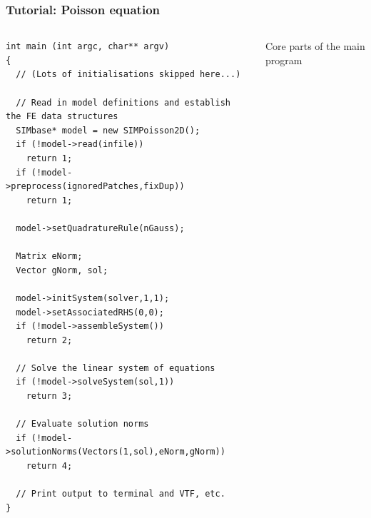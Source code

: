 \documentclass{beamer}
\begin{document}
\begin{frame}[fragile] %
 \frametitle{Tutorial: Poisson equation}

 \begin{columns}[c]
  \tiny\begin{verbatim}
int main (int argc, char** argv)
{
  // (Lots of initialisations skipped here...)

  // Read in model definitions and establish the FE data structures
  SIMbase* model = new SIMPoisson2D();
  if (!model->read(infile))
    return 1;
  if (!model->preprocess(ignoredPatches,fixDup))
    return 1;

  model->setQuadratureRule(nGauss);

  Matrix eNorm;
  Vector gNorm, sol;

  model->initSystem(solver,1,1);
  model->setAssociatedRHS(0,0);
  if (!model->assembleSystem())
    return 2;

  // Solve the linear system of equations
  if (!model->solveSystem(sol,1))
    return 3;

  // Evaluate solution norms
  if (!model->solutionNorms(Vectors(1,sol),eNorm,gNorm))
    return 4;

  // Print output to terminal and VTF, etc.
}
  \end{verbatim}
  \small
  Core parts of the main program
 \end{columns}
\end{frame}
\end{document}
